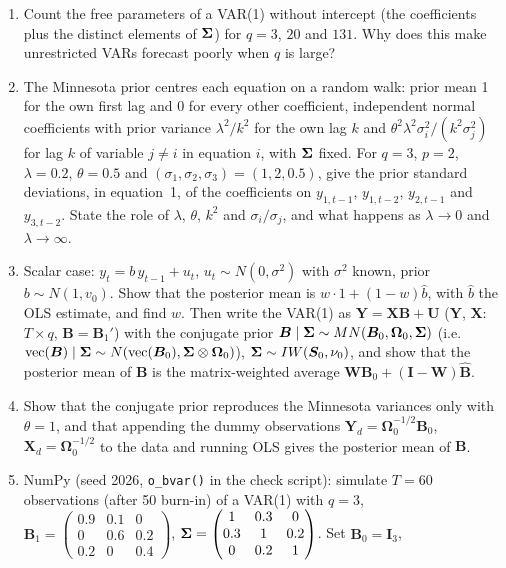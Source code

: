 \documentclass[11pt,a4paper]{article}
\begin{document}
\begin{enumerate}[label=(\alph*),leftmargin=2em]
\item Count the free parameters of a VAR(1) without intercept (the coefficients plus the distinct elements of
$\bm{\Sigma}$) for $q=3$, $20$ and $131$. Why does this make unrestricted VARs forecast poorly when $q$ is large?
\item The Minnesota prior centres each equation on a random walk: prior mean 1 for the own first lag and 0 for every
other coefficient, independent normal coefficients with prior variance $\lambda^2/k^2$ for the own lag $k$ and
$\theta^2\lambda^2\sigma_i^2/(k^2\sigma_j^2)$ for lag $k$ of variable $j\neq i$ in equation $i$, with $\bm{\Sigma}$ fixed.
For $q=3$, $p=2$, $\lambda=0.2$, $\theta=0.5$ and $(\sigma_1,\sigma_2,\sigma_3)=(1,2,0.5)$, give the prior standard
deviations, in equation~1, of the coefficients on $y_{1,t-1}$, $y_{1,t-2}$, $y_{2,t-1}$ and $y_{3,t-2}$. State the role
of $\lambda$, $\theta$, $k^2$ and $\sigma_i/\sigma_j$, and what happens as $\lambda\to0$ and $\lambda\to\infty$.
\item Scalar case: $y_t=b\,y_{t-1}+u_t$, $u_t\sim N(0,\sigma^2)$ with $\sigma^2$ known, prior $b\sim N(1,v_0)$. Show that the
posterior mean is $w\cdot1+(1-w)\hat b$, with $\hat b$ the OLS estimate, and find $w$. Then write the VAR(1) as
$\bm Y=\bm X\bm B+\bm U$ ($\bm Y$, $\bm X$: $T\times q$, $\bm B=\bm B_1'$) with the conjugate prior
$\bm B\mid\bm{\Sigma}\sim MN(\bm B_0,\bm\Omega_0,\bm{\Sigma})$ (i.e.\ $\mathrm{vec}(\bm B)\mid\bm{\Sigma}\sim N(\mathrm{vec}(\bm B_0),\bm{\Sigma}\otimes\bm\Omega_0)$),
$\bm{\Sigma}\sim IW(\bm S_0,\nu_0)$, and show that the posterior mean of $\bm B$ is the matrix-weighted average
$\bm W\bm B_0+(\bm I-\bm W)\hat{\bm B}$.
\item Show that the conjugate prior reproduces the Minnesota variances only with $\theta=1$, and that appending the dummy
observations $\bm Y_d=\bm\Omega_0^{-1/2}\bm B_0$, $\bm X_d=\bm\Omega_0^{-1/2}$ to the data and running OLS gives the
posterior mean of $\bm B$.
\item NumPy (seed 2026, \texttt{o\_bvar()} in the check script): simulate $T=60$ observations (after 50 burn-in) of a
VAR(1) with $q=3$,
$\bm B_1=\begin{pmatrix}0.9&0.1&0\\0&0.6&0.2\\0.2&0&0.4\end{pmatrix}$,
$\bm{\Sigma}=\begin{pmatrix}1&0.3&0\\0.3&1&0.2\\0&0.2&1\end{pmatrix}$. Set $\bm B_0=\bm I_3$,

\end{enumerate}
\end{document}
